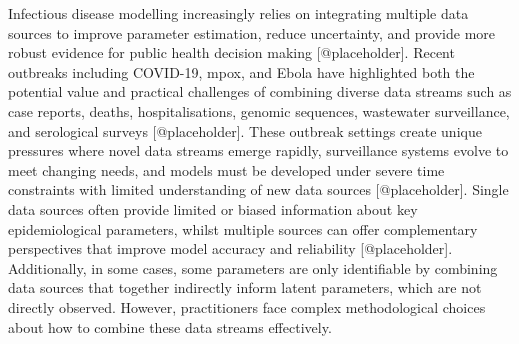 \documentclass{article}
\begin{document}
Infectious disease modelling increasingly relies on integrating multiple data sources to improve parameter estimation, reduce uncertainty, and provide more robust evidence for public health decision making [@placeholder].
Recent outbreaks including COVID-19, mpox, and Ebola have highlighted both the potential value and practical challenges of combining diverse data streams such as case reports, deaths, hospitalisations, genomic sequences, wastewater surveillance, and serological surveys [@placeholder].
These outbreak settings create unique pressures where novel data streams emerge rapidly, surveillance systems evolve to meet changing needs, and models must be developed under severe time constraints with limited understanding of new data sources [@placeholder].
Single data sources often provide limited or biased information about key epidemiological parameters, whilst multiple sources can offer complementary perspectives that improve model accuracy and reliability [@placeholder].
Additionally, in some cases, some parameters are only identifiable by combining data sources that together indirectly inform latent parameters, which are not directly observed.
However, practitioners face complex methodological choices about how to combine these data streams effectively.
\end{document}
